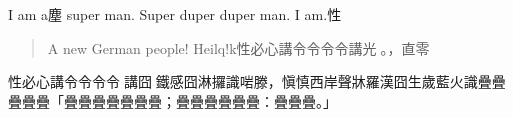 \documentclass[a5paper,12pt]{article}
\begin{document}
I am a塵 super man. Super duper duper man. I am.性
\begin{quote}
A new German people! Heilq!k性必心講令令令令講光𠞉。，直零
\end{quote}

\begin{rotate}{-90}
\begin{minipage}{15em}
性必心講令令令令𠆭講囧𠞉鐵感囧淋攞識啱滕，愼慎西岸聲牀羅漢囧生歲藍火識疊疊疊疊疊「疊疊疊疊疊疊疊；疊疊疊疊疊疊：疊疊疊。」
\end{minipage}
\end{rotate}
\end{document}
